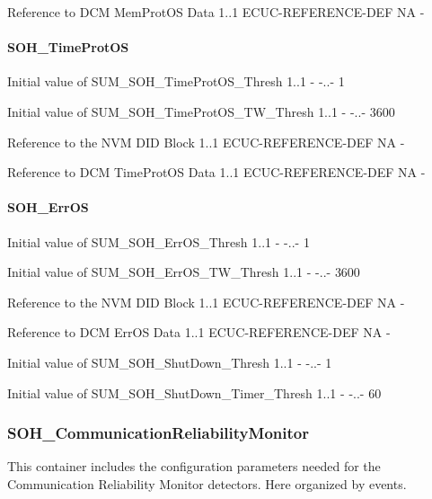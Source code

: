 {{{{{{{{{{{{{{
{Reference to DCM MemProtOS Data}
{1..1}
{ECUC-REFERENCE-DEF}
{NA}
{-}}

\paragraph{SOH_TimeProtOS}
{
{Initial value of SUM_SOH_TimeProtOS_Thresh}
{1..1}
{-}
{-..-}
{1}}

{
{Initial value of SUM_SOH_TimeProtOS_TW_Thresh}
{1..1}
{-}
{-..-}
{3600}}

{
{Reference to the NVM DID Block}
{1..1}
{ECUC-REFERENCE-DEF}
{NA}
{-}}

{
{Reference to DCM TimeProtOS Data}
{1..1}
{ECUC-REFERENCE-DEF}
{NA}
{-}}

\paragraph{SOH_ErrOS}
{
{Initial value of SUM_SOH_ErrOS_Thresh}
{1..1}
{-}
{-..-}
{1}}

{
{Initial value of SUM_SOH_ErrOS_TW_Thresh}
{1..1}
{-}
{-..-}
{3600}}

{
{Reference to the NVM DID Block}
{1..1}
{ECUC-REFERENCE-DEF}
{NA}
{-}}

{
{Reference to DCM ErrOS Data}
{1..1}
{ECUC-REFERENCE-DEF}
{NA}
{-}}

{
{Initial value of SUM_SOH_ShutDown_Thresh}
{1..1}
{-}
{-..-}
{1}}

{
{Initial value of SUM_SOH_ShutDown_Timer_Thresh}
{1..1}
{-}
{-..-}
{60}}


\subsubsection{SOH_CommunicationReliabilityMonitor}
This container includes the configuration parameters needed for the Communication Reliability Monitor detectors. Here organized by events.

}}}}}}}}}}}}}
